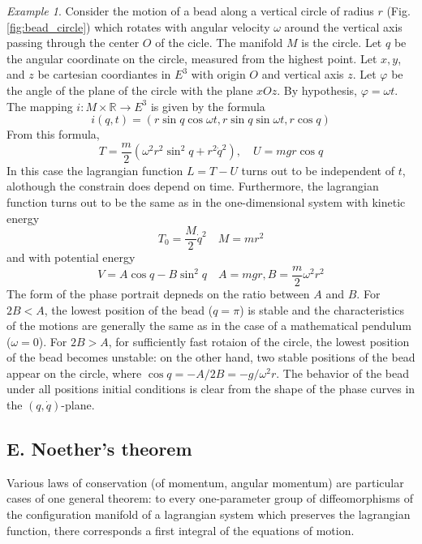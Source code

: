 \documentclass[conference]{IEEEtran}
\theoremstyle{definition}
\theoremstyle{remark}
\newtheorem{exmp}{Example}
\begin{document}
    \begin{exmp}
        Consider the motion of a bead along a vertical circle of radius $r$ (Fig. \ref{fig:bead_circle}) which rotates with angular velocity $\omega$ around the vertical axis passing through the center $O$ of the cicle. The manifold $M$ is the circle. Let $q$ be the angular coordinate on the circle, measured from the highest point. Let $x, y$, and $z$ be cartesian coordiantes in $E^3$ with origin $O$ and vertical axis $z$. Let $\varphi$ be the angle of the plane of the circle with the plane $xOz$. By hypothesis, $\varphi = \omega t$. The mapping $i: M \times \mathbb{R} \to E^3$ is given by the formula
        \begin{equation*}
            i(q, t) = (r \sin q \cos \omega t, r \sin q \sin \omega t, r \cos q)
        \end{equation*}
        From this formula,
        \begin{equation*}
            T = \dfrac{m}{2} (\omega^2 r^2 \sin^2 q + r^2 \dot{q}^2), \quad U = mgr \cos q
        \end{equation*}
        In this case the lagrangian function $L = T - U$ turns out to be independent of $t$, alothough the constrain does depend on time. Furthermore, the lagrangian function turns out to be the same as in the one-dimensional system with kinetic energy
        \begin{equation*}
            T_0 = \dfrac{M}{2} \dot{q}^2 \quad M = mr^2
        \end{equation*}
        and with potential energy
        \begin{equation*}
            V = A \cos q - B \sin^2 q \quad A = mgr, B = \dfrac{m}{2} \omega^2 r^2
        \end{equation*}
        The form of the phase portrait depneds on the ratio between $A$ and $B$. For $2B < A$, the lowest position of the bead ($q = \pi$) is stable and the characteristics of the motions are generally the same as in the case of a mathematical pendulum ($\omega = 0$). For $2B > A$, for sufficiently fast rotaion of the circle, the lowest position of the bead becomes unstable: on the other hand, two stable positions of the bead appear on the circle, where $\cos q = -A / 2B = -g / \omega^2 r$. The behavior of the bead under all positions initial conditions is clear from the shape of the phase curves in the $(q, \dot{q})$-plane.
    \end{exmp}

    \subsection{E. Noether's theorem}
    Various laws of conservation (of momentum, angular momentum) are particular cases of one general theorem: to every one-parameter group of diffeomorphisms of the configuration manifold of a lagrangian system which preserves the lagrangian function, there corresponds a first integral of the equations of motion.
\end{document}
